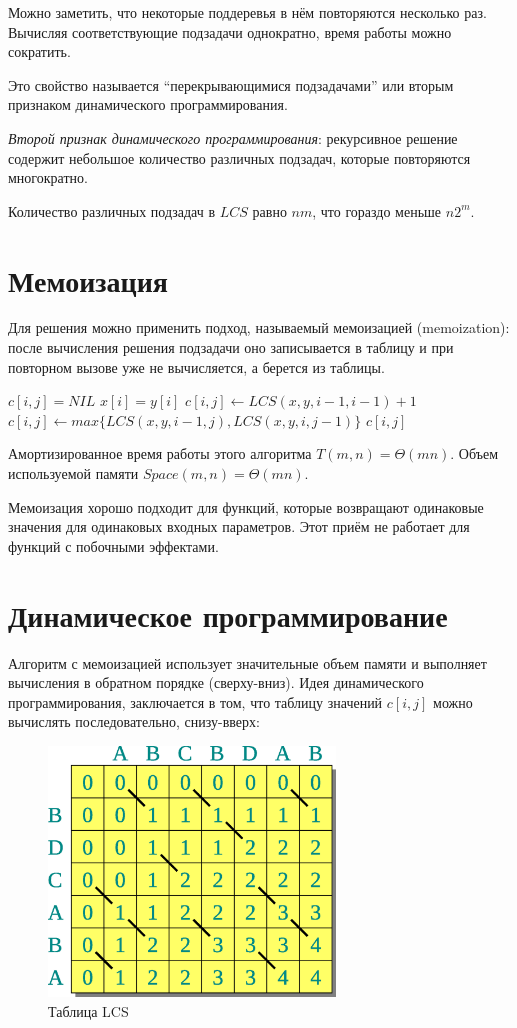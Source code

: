 \documentclass[11pt]{article}
\begin{document}
Можно заметить, что некоторые поддеревья в нём повторяются несколько раз. Вычисляя соответствующие подзадачи однократно, время работы можно сократить.

Это свойство называется ``перекрывающимися подзадачами'' или вторым признаком динамического программирования.

\emph{Второй признак динамического программирования}: рекурсивное решение содержит небольшое количество различных подзадач, которые повторяются многократно.

Количество различных подзадач в $LCS$ равно $nm$, что гораздо меньше $n2^m$.

\section{Мемоизация}
Для решения можно применить подход, называемый мемоизацией (memoization): после вычисления решения подзадачи оно записывается в таблицу и при повторном вызове уже не вычисляется, а берется из таблицы.

\begin{codebox}
\li \If $c[i,j] = NIL$
\li \Then \If $x[i] = y[i]$
\li     \Then $c[i,j] \gets LCS(x, y, i-1, i-1)+1$
\li     \Else $c[i,j] \gets max\{LCS(x, y, i-1, j), LCS(x, y, i, j-1)\}$
      \End
    \End
\li \Return $c[i,j]$
\end{codebox}
Амортизированное время работы этого алгоритма $T(m, n) = \Theta(mn)$. Объем используемой памяти $Space(m, n) = \Theta(mn)$.

Мемоизация хорошо подходит для функций, которые возвращают одинаковые значения для одинаковых входных параметров. Этот приём не работает для функций с побочными эффектами.

\section{Динамическое программирование}
Алгоритм с мемоизацией использует значительные объем памяти и выполняет вычисления в обратном порядке (сверху-вниз). Идея динамического программирования, заключается в том, что таблицу значений $c[i,j]$ можно вычислять последовательно, снизу-вверх:
\begin{figure}[h!]
  \centering
  \includegraphics[width=3in]{lecture15/table1.eps}
  \caption{Таблица LCS}
\end{figure}
\end{document}
